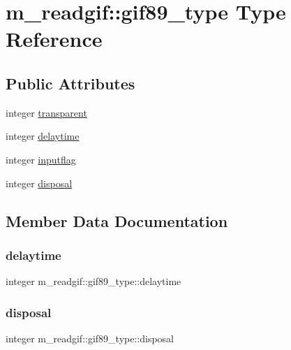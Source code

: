 \hypertarget{structm__readgif_1_1gif89__type}{}\section{m\+\_\+readgif\+:\+:gif89\+\_\+type Type Reference}
\label{structm__readgif_1_1gif89__type}
\subsection*{Public Attributes}
\begin{DoxyCompactItemize}
\item 
integer \hyperlink{structm__readgif_1_1gif89__type_aa7d3577606d5b12cdaf941f2f467e1b3}{transparent}
\item 
integer \hyperlink{structm__readgif_1_1gif89__type_a01ebd8a9aaec996586e0843459fe1ceb}{delaytime}
\item 
integer \hyperlink{structm__readgif_1_1gif89__type_aa2e42514cf1c8e2e8b11740ab3a72115}{inputflag}
\item 
integer \hyperlink{structm__readgif_1_1gif89__type_a7074fba305068168af3a7e6044d26133}{disposal}
\end{DoxyCompactItemize}


\subsection{Member Data Documentation}
\mbox{\label{structm__readgif_1_1gif89__type_a01ebd8a9aaec996586e0843459fe1ceb}} 
\subsubsection{\texorpdfstring{delaytime}{delaytime}}
{\footnotesize\ttfamily integer m\+\_\+readgif\+::gif89\+\_\+type\+::delaytime}

\mbox{\label{structm__readgif_1_1gif89__type_a7074fba305068168af3a7e6044d26133}} 
\subsubsection{\texorpdfstring{disposal}{disposal}}
{\footnotesize\ttfamily integer m\+\_\+readgif\+::gif89\+\_\+type\+::disposal}

